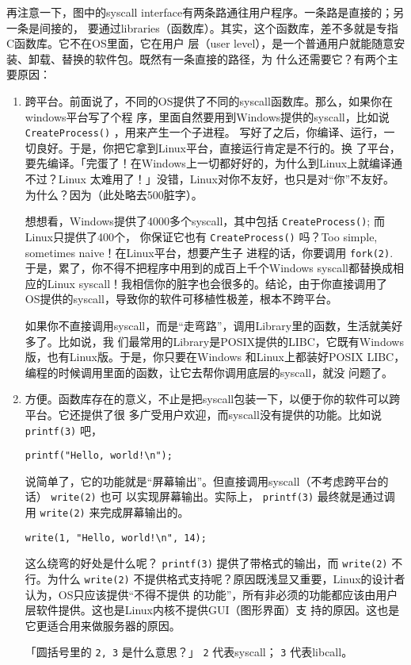 \documentclass{wx672ctexart}
\begin{document}
再注意一下，图中的syscall interface有两条路通往用户程序。一条路是直接的；另一条是间接的，
要通过libraries（函数库）。其实，这个函数库，差不多就是专指C函数库。它不在OS里面，它在用户
层（user level），是一个普通用户就能随意安装、卸载、替换的软件包。既然有一条直接的路径，为
什么还需要它？有两个主要原因：
\begin{enumerate}
\item 跨平台。前面说了，不同的OS提供了不同的syscall函数库。那么，如果你在windows平台写了个程
序，里面自然要用到Windows提供的syscall，比如说 \texttt{CreateProcess()} ，用来产生一个子进程。
写好了之后，你编译、运行，一切良好。于是，你把它拿到Linux平台，直接运行肯定是不行的。换
了平台，要先编译。「完蛋了！在Windows上一切都好好的，为什么到Linux上就编译通不过？Linux
太难用了！」没错，Linux对你不友好，也只是对“你”不友好。为什么？因为（此处略去500脏字）。

想想看，Windows提供了4000多个syscall，其中包括 \texttt{CreateProcess()}; 而Linux只提供了400个，
你保证它也有 \texttt{CreateProcess()} 吗？Too simple, sometimes naive！在Linux平台，想要产生子
进程的话，你要调用 \texttt{fork(2)}. 于是，累了，你不得不把程序中用到的成百上千个Windows
syscall都替换成相应的Linux syscall！我相信你的脏字也会很多的。结论，由于你直接调用了
OS提供的syscall，导致你的软件可移植性极差，根本不跨平台。

如果你不直接调用syscall，而是“走弯路”，调用Library里的函数，生活就美好多了。比如说，我
们最常用的Library是POSIX提供的LIBC，它既有Windows版，也有Linux版。于是，你只要在Windows
和Linux上都装好POSIX LIBC，编程的时候调用里面的函数，让它去帮你调用底层的syscall，就没
问题了。
\item 方便。函数库存在的意义，不止是把syscall包装一下，以便于你的软件可以跨平台。它还提供了很
多广受用户欢迎，而syscall没有提供的功能。比如说 \texttt{printf(3)} 吧，
\begin{verbatim}
printf("Hello, world!\n");
\end{verbatim}
说简单了，它的功能就是“屏幕输出”。但直接调用syscall（不考虑跨平台的话） \texttt{write(2)} 也可
以实现屏幕输出。实际上， \texttt{printf(3)} 最终就是通过调用 \texttt{write(2)} 来完成屏幕输出的。
\begin{verbatim}
write(1, "Hello, world!\n", 14);
\end{verbatim}

这么绕弯的好处是什么呢？ \texttt{printf(3)} 提供了带格式的输出，而 \texttt{write(2)} 不行。为什么
\texttt{write(2)} 不提供格式支持呢？原因既浅显又重要，Linux的设计者认为，OS只应该提供“不得不提供
的功能”，所有非必须的功能都应该由用户层软件提供。这也是Linux内核不提供GUI（图形界面）支
持的原因。这也是它更适合用来做服务器的原因。

「圆括号里的 \texttt{2, 3} 是什么意思？」 \texttt{2} 代表syscall； \texttt{3} 代表libcall。
\end{enumerate}
\end{document}
